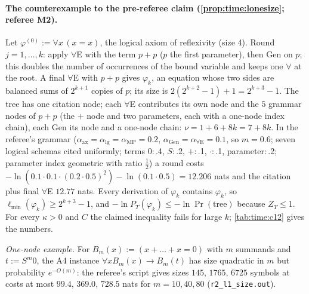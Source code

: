 \paragraph{The counterexample to the pre-referee claim (\cref{prop:time:lonesize}; referee M2).} Let $\varphi^{(0)}:=\forall x\,(x=x)$, the logical axiom of reflexivity (size 4). Round $j=1,\dots,k$: apply $\forall$E with the term $p+p$ ($p$ the first parameter), then Gen on $p$; this doubles the number of occurrences of the bound variable and keeps one $\forall$ at the root. A final $\forall$E with $p+p$ gives $\varphi_k$, an equation whose two sides are balanced sums of $2^{k+1}$ copies of $p$; its size is $2(2^{k+2}-1)+1=2^{k+3}-1$. The tree has one citation node; each $\forall$E contributes its own node and the $5$ grammar nodes of $p+p$ (the $+$ node and two parameters, each with a one-node index chain), each Gen its node and a one-node chain: $\nu=1+6+8k=7+8k$. In the referee's grammar ($\alpha_{\mathrm{ax}}=\alpha_{\mathrm{lg}}=\alpha_{\mathrm{MP}}=0.2$, $\alpha_{\mathrm{Gen}}=\alpha_{\forall\mathrm E}=0.1$, so $m=0.6$; seven logical schemas cited uniformly; terms $0$:\,.4, $S$:\,.2, $+$:\,.1, $\cdot$:\,.1, parameter:\,.2; parameter index geometric with ratio $\tfrac12$) a round costs $-\ln(0.1\cdot0.1\cdot(0.2\cdot0.5)^2)-\ln(0.1\cdot0.5)=12.206$ nats and the citation plus final $\forall$E $12.77$ nats. Every derivation of $\varphi_k$ contains $\varphi_k$, so $\ell_{\min}(\varphi_k)\ge2^{k+3}-1$, and $-\ln P_T(\varphi_k)\le-\ln\Pr(\text{tree})$ because $Z_T\le1$. For every $\kappa>0$ and $C$ the claimed inequality fails for large $k$; \cref{tab:time:c12} gives the numbers.

\emph{One-node example.} For $B_m(x):=(x+\dots+x=0)$ with $m$ summands and $t:=S^m0$, the A4 instance $\forall xB_m(x)\to B_m(t)$ has size quadratic in $m$ but probability $e^{-O(m)}$: the referee's script gives sizes $145$, $1765$, $6725$ symbols at costs at most $99.4$, $369.0$, $728.5$ nats for $m=10,40,80$ (\texttt{r2\_l1\_size.out}).

